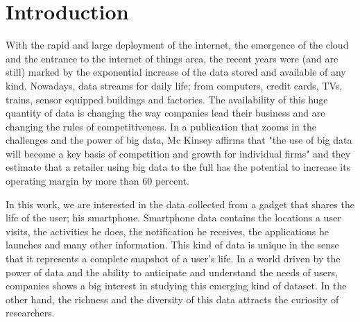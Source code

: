 
\chapter{Introduction} %

\label{Chapter1} %




With the rapid and large deployment of the internet, the emergence of the cloud and the entrance to the internet of things area, the recent years were (and are still) marked by the exponential increase of the data stored and available of any kind. Nowadays, data streams for daily life; from computers, credit cards, TVs, trains, sensor equipped buildings and factories. The availability of this huge quantity of data is changing the way companies lead their business and are changing the rules of competitiveness. In a publication that zooms in the challenges and the power of big data, Mc Kinsey affirms that "the use of big data will become a key basis of competition and growth for individual firms" and they estimate that a retailer using big data to the full has the potential to increase its operating margin by more than 60 percent.\par

In this work, we are interested in the data collected from a gadget that shares the life of the user; his smartphone. Smartphone data contains the locations a user visits, the activities he does, the notification he receives, the applications he launches and many other information. This kind of data is unique in the sense that it represents a complete snapshot of a user's life. In a world driven by the power of data and the ability to anticipate and understand the needs of users, companies shows a big interest in studying this emerging kind of dataset. In the other hand, the richness  and the diversity of this data attracts the curiosity of researchers.\par

